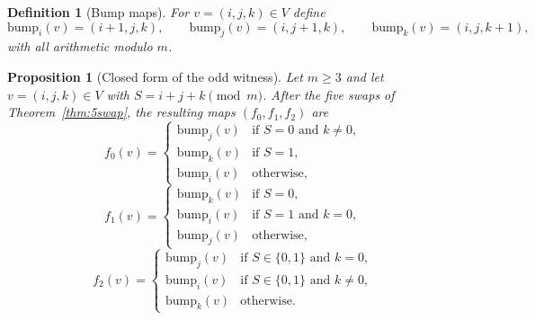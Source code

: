 \documentclass[11pt]{article}
\newtheorem{proposition}{Proposition}
\newtheorem{definition}{Definition}
\begin{document}
\begin{definition}[Bump maps]
For $v=(i,j,k)\in V$ define
\[
\mathrm{bump}_i(v)=(i+1,j,k),\qquad
\mathrm{bump}_j(v)=(i,j+1,k),\qquad
\mathrm{bump}_k(v)=(i,j,k+1),
\]
with all arithmetic modulo $m$.
\end{definition}

\begin{proposition}[Closed form of the odd witness]\label{prop:odd-closed}
Let $m\ge 3$ and let $v=(i,j,k)\in V$ with $S=i+j+k\pmod m$.
After the five swaps of Theorem~\ref{thm:5swap}, the resulting maps $(f_0,f_1,f_2)$ are
\[
f_0(v)=
\begin{cases}
\mathrm{bump}_j(v) & \text{if } S=0 \text{ and } k\neq 0,\\
\mathrm{bump}_k(v) & \text{if } S=1,\\
\mathrm{bump}_i(v) & \text{otherwise,}
\end{cases}
\]
\[
f_1(v)=
\begin{cases}
\mathrm{bump}_k(v) & \text{if } S=0,\\
\mathrm{bump}_i(v) & \text{if } S=1 \text{ and } k=0,\\
\mathrm{bump}_j(v) & \text{otherwise,}
\end{cases}
\]
\[
f_2(v)=
\begin{cases}
\mathrm{bump}_j(v) & \text{if } S\in\{0,1\} \text{ and } k=0,\\
\mathrm{bump}_i(v) & \text{if } S\in\{0,1\} \text{ and } k\neq 0,\\
\mathrm{bump}_k(v) & \text{otherwise.}
\end{cases}
\]
\end{proposition}
\end{document}
